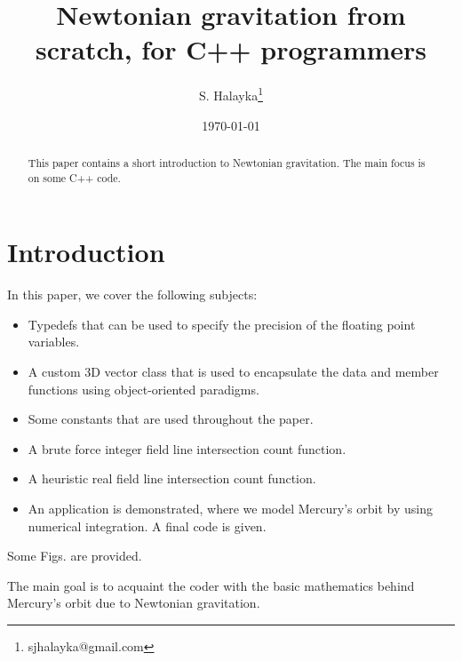 \documentclass[12pt]{article}
\title{Newtonian gravitation from scratch, for C++ programmers}
\author{S. Halayka\footnote{sjhalayka@gmail.com}}
\date{\today\;\currenttime}
\begin{document}
 
\maketitle

\begin{abstract}
This paper contains a short introduction to Newtonian gravitation.
The main focus is on some C++ code.
\end{abstract}




\section{Introduction}

In this paper, we cover the following subjects:
\begin{itemize}
\item Typedefs that can be used to specify the precision of the floating point variables.
\item A custom 3D vector class that is used to encapsulate the data and member functions using object-oriented paradigms.
\item Some constants that are used throughout the paper.
\item A brute force integer field line intersection count function.
\item A heuristic real field line intersection count function.
\item An application is demonstrated, where we model Mercury's orbit by using numerical integration.
A final code is given.
\end{itemize}
Some Figs. are provided.

The main goal is to acquaint the coder with the basic mathematics behind Mercury's orbit due to Newtonian gravitation.
\end{document}
